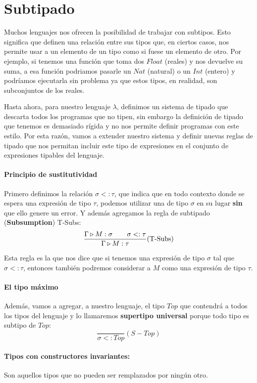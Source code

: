 \section{Subtipado}
Muchos lenguajes nos ofrecen la posibilidad de trabajar con subtipos. Esto significa que definen una relación entre sus tipos que, en ciertos casos, nos permite usar a un elemento de un tipo como si fuese un elemento de otro.  Por ejemplo, si tenemos una función que toma dos $Float$ (reales) y nos devuelve su suma, a esa función podriamos pasarle un $Nat$ (natural) o un $Int$ (entero) y podríamos ejecutarla sin problema ya que estos tipos, en realidad, son subconjuntos de los reales.

Hasta ahora, para nuestro lenguaje $\lambda$, definimos un sistema de tipado que descarta todos los programas que no tipen, sin embargo la definición de tipado que tenemos es demasiado rígida y no nos permite definir programas con este estilo. Por esta razón, vamos a extender nuestro sistema y definir nuevas reglas de tipado que nos permitan incluir este tipo de expresiones en el conjunto de expresiones tipables del lenguaje.

\paragraph{Principio de sustitutividad}
Primero definimos la relación $\sigma <: \tau$, que indica que en todo contexto donde se espera una expresión de tipo $\tau$, podemos utilizar una de tipo $\sigma$ en su lugar \textbf{sin} que ello genere un error. Y además agregamos la regla de subtipado (\textbf{Subsumption}) T-Subs:
$$\frac{\Gamma\triangleright M : \sigma~\hspace*{5mm}~\sigma <:\tau}{\Gamma\triangleright M : \tau}(\text{T-Subs})$$

Esta regla es la que nos dice que si tenemos una expresión de tipo $\sigma$ tal que $\sigma <: \tau$, entonces también podremos considerar a $M$ como una expresión de tipo $\tau$.
\paragraph{El tipo máximo}  Además, vamos a agregar, a nuestro lenguaje, el tipo $Top$ que contendrá a todos los tipos del lenguaje y lo llamaremos \textbf{supertipo universal} porque todo tipo es subtipo de $Top$:
$$\frac{}{\sigma <: Top}(S-Top)$$

\paragraph{Tipos con constructores invariantes:} Son aquellos tipos que no pueden ser remplazados por ningún otro.

